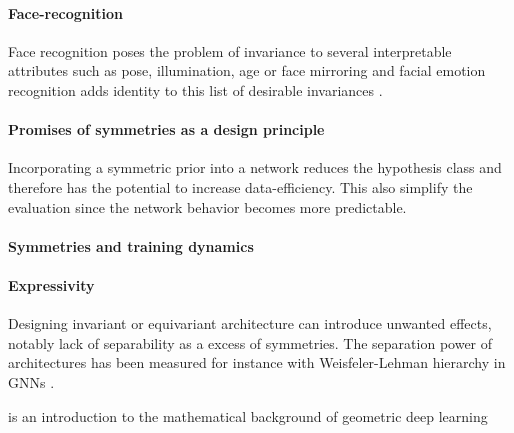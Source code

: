 \myline

\paragraph{Face-recognition}
Face recognition poses the problem of invariance to several interpretable attributes such as pose, illumination, age or face mirroring \cite{lal2018ijacsa,leroy2025} and facial emotion recognition adds identity to this list of desirable invariances \cite{bhattacharya20192sicaccpi,huang2019s}.

\myline

\paragraph{Promises of symmetries as a design principle} Incorporating a symmetric prior into a network reduces the hypothesis class and therefore has the potential to increase data-efficiency.
This also simplify the evaluation since the network behavior becomes more predictable. 

\myline

\paragraph{Symmetries and training dynamics} \cite{chen2024jsm} 

\myline

\paragraph{Expressivity} Designing invariant or equivariant architecture can introduce unwanted effects, notably lack of separability as a excess of symmetries.
The separation power of architectures has been measured for instance with Weisfeler-Lehman hierarchy in GNNs .


\myline

\cite{borde2025} is an introduction to the mathematical background of geometric deep learning 

\myline


